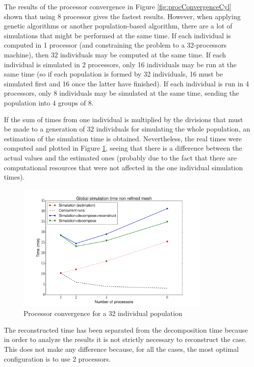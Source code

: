 \newpage

The results of the processor convergence in Figure \ref{fig:procConvergenceCyl} shown that using $8$ processor gives the fastest results. However, when applying genetic algorithms or another population-based algorithm, there are a lot of simulations that might be performed at the same time. If each individual is computed in 1 processor (and constraining the problem to a 32-processors machine), then 32 individuals may be computed at the same time. If each individual is simulated in 2 processors, only 16 individuals may be run at the same time (so if each population is formed by 32 individuals, 16 must be simulated first and 16 once the latter have finished). If each individual is run in 4 processors, only 8 individuals may be simulated at the same time, sending the population into 4 groups of 8. 


If the sum of times from one individual is multiplied by the divisions that must be made to a generation of $32$ individuals for simulating the whole population, an estimation of the simulation time is obtained. Nevertheless, the real times were computed and plotted in Figure \ref{fig:genProcConvergenceCyl}, seeing that there is a difference between the actual values and the estimated ones (probably due to the fact that there are computational resources that were not affected in the one individual simulation times).  

     \begin{figure}[h!]
        \centering
        \includegraphics[width=0.85\textwidth]{Figures/3/procConv_1gen2.pdf}
        \caption{Processor convergence for a 32 individual population}
        \label{fig:genProcConvergenceCyl}
    \end{figure}

The reconstructed time has been separated from the decomposition time because in order to analyze the results it is not strictly necessary to reconstruct the case. This does not make any difference because, for all the cases, the most optimal configuration is to use 2 processors. 

